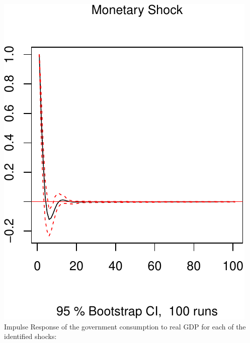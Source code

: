 \documentclass[11pt,preprint, authoryear]{elsarticle}
\numberwithin{equation}{section}
\numberwithin{figure}{section}
\numberwithin{table}{section}
\begin{document}
\includegraphics{TS_proj_files/figure-latex/unnamed-chunk-37-3.pdf}
\newpage Impulse Response of the government consumption to real GDP for
each of the identified shocks:
\end{document}

